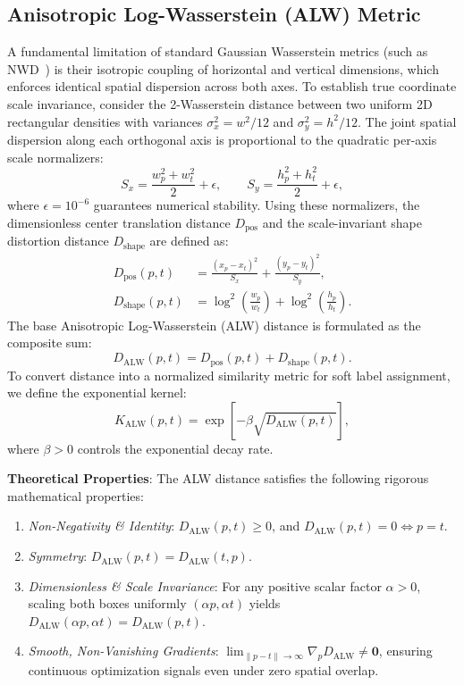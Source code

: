 \subsection{Anisotropic Log-Wasserstein (ALW) Metric}
\label{subsec:alw_metric}
A fundamental limitation of standard Gaussian Wasserstein metrics (such as NWD~\cite{xu2022nwd}) is their isotropic coupling of horizontal and vertical dimensions, which enforces identical spatial dispersion across both axes. To establish true coordinate scale invariance, consider the 2-Wasserstein distance between two uniform 2D rectangular densities with variances $\sigma_{x}^2 = w^2/12$ and $\sigma_{y}^2 = h^2/12$. The joint spatial dispersion along each orthogonal axis is proportional to the quadratic per-axis scale normalizers:
\begin{equation}
S_x = \frac{w_p^2 + w_t^2}{2} + \epsilon, \qquad S_y = \frac{h_p^2 + h_t^2}{2} + \epsilon,
\label{eq:scale_normalizers}
\end{equation}
where $\epsilon = 10^{-6}$ guarantees numerical stability. Using these normalizers, the dimensionless center translation distance $D_{\mathrm{pos}}$ and the scale-invariant shape distortion distance $D_{\mathrm{shape}}$ are defined as:
\begin{align}
D_{\mathrm{pos}}(p, t) &= \frac{(x_p - x_t)^2}{S_x} + \frac{(y_p - y_t)^2}{S_y}, \label{eq:d_pos} \\
D_{\mathrm{shape}}(p, t) &= \log^2\!\left(\frac{w_p}{w_t}\right) + \log^2\!\left(\frac{h_p}{h_t}\right). \label{eq:d_shape}
\end{align}
The base Anisotropic Log-Wasserstein (ALW) distance is formulated as the composite sum:
\begin{equation}
D_{\mathrm{ALW}}(p, t) = D_{\mathrm{pos}}(p, t) + D_{\mathrm{shape}}(p, t).
\label{eq:d_alw}
\end{equation}
To convert distance into a normalized similarity metric for soft label assignment, we define the exponential kernel:
\begin{equation}
K_{\mathrm{ALW}}(p, t) = \exp\left[ -\beta \sqrt{D_{\mathrm{ALW}}(p, t)} \right],
\label{eq:k_alw}
\end{equation}
where $\beta > 0$ controls the exponential decay rate.

\textbf{Theoretical Properties}: The ALW distance satisfies the following rigorous mathematical properties:
\begin{enumerate}
    \item \emph{Non-Negativity \& Identity}: $D_{\mathrm{ALW}}(p, t) \ge 0$, and $D_{\mathrm{ALW}}(p, t) = 0 \iff p = t$.
    \item \emph{Symmetry}: $D_{\mathrm{ALW}}(p, t) = D_{\mathrm{ALW}}(t, p)$.
    \item \emph{Dimensionless \& Scale Invariance}: For any positive scalar factor $\alpha > 0$, scaling both boxes uniformly $(\alpha p, \alpha t)$ yields $D_{\mathrm{ALW}}(\alpha p, \alpha t) = D_{\mathrm{ALW}}(p, t)$.
    \item \emph{Smooth, Non-Vanishing Gradients}: $\lim_{\|p-t\| \to \infty} \nabla_p D_{\mathrm{ALW}} \neq \mathbf{0}$, ensuring continuous optimization signals even under zero spatial overlap.
\end{enumerate}

